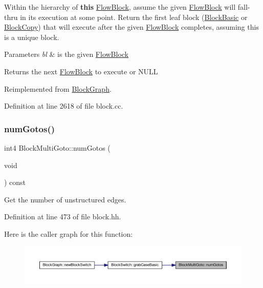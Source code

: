 Within the hierarchy of {\bfseries{this}} \mbox{\hyperlink{class_flow_block}{Flow\+Block}}, assume the given \mbox{\hyperlink{class_flow_block}{Flow\+Block}} will fall-\/thru in its execution at some point. Return the first leaf block (\mbox{\hyperlink{class_block_basic}{Block\+Basic}} or \mbox{\hyperlink{class_block_copy}{Block\+Copy}}) that will execute after the given \mbox{\hyperlink{class_flow_block}{Flow\+Block}} completes, assuming this is a unique block. 
\begin{DoxyParams}{Parameters}
{\em bl} & is the given \mbox{\hyperlink{class_flow_block}{Flow\+Block}} \\
\hline
\end{DoxyParams}
\begin{DoxyReturn}{Returns}
the next \mbox{\hyperlink{class_flow_block}{Flow\+Block}} to execute or N\+U\+LL 
\end{DoxyReturn}


Reimplemented from \mbox{\hyperlink{class_block_graph_aba0d42cf572bdcf2bca44d22fad971f6}{Block\+Graph}}.



Definition at line 2618 of file block.\+cc.

\mbox{\label{class_block_multi_goto_a8a98ae30b486ab27e453e78c37a194c9}} 
\subsubsection{\texorpdfstring{numGotos()}{numGotos()}}
{\footnotesize\ttfamily int4 Block\+Multi\+Goto\+::num\+Gotos (\begin{DoxyParamCaption}\item[{void}]{ }\end{DoxyParamCaption}) const\hspace{0.3cm}{\ttfamily [inline]}}



Get the number of unstructured edges. 



Definition at line 473 of file block.\+hh.

Here is the caller graph for this function\+:
\nopagebreak
\begin{figure}[H]
\begin{center}
\leavevmode
\includegraphics[width=350pt]{class_block_multi_goto_a8a98ae30b486ab27e453e78c37a194c9_icgraph}
\end{center}
\end{figure}
\mbox{\label{class_block_multi_goto_a0886201717ed839e30e4e8e2b39d33d7}} 
